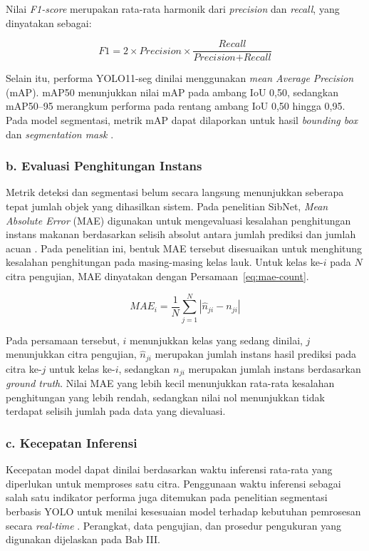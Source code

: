 Nilai \textit{F1-score} merupakan rata-rata harmonik dari \textit{precision} dan \textit{recall}, yang dinyatakan sebagai:

\begin{equation}
    F1 = 2 \times
		{\textit{Precision}} \times
    \frac{\textit{Recall}}
         {\textit{Precision} + \textit{Recall}}
    \label{eq:f1}
\end{equation}

Selain itu, performa YOLO11-seg dinilai menggunakan \textit{mean Average Precision} (mAP). mAP50 menunjukkan nilai mAP pada ambang IoU 0,50, sedangkan mAP50--95 merangkum performa pada rentang ambang IoU 0,50 hingga 0,95. Pada model segmentasi, metrik mAP dapat dilaporkan untuk hasil \textit{bounding box} dan \textit{segmentation mask} \cite{qiu2025,syafira2025}.

\subsubsection*{b. Evaluasi Penghitungan Instans}

Metrik deteksi dan segmentasi belum secara langsung menunjukkan seberapa tepat jumlah objek yang dihasilkan sistem. Pada penelitian SibNet, \textit{Mean Absolute Error} (MAE) digunakan untuk mengevaluasi kesalahan penghitungan instans makanan berdasarkan selisih absolut antara jumlah prediksi dan jumlah acuan \cite{nguyen2022sibnet}. Pada penelitian ini, bentuk MAE tersebut disesuaikan untuk menghitung kesalahan penghitungan pada masing-masing kelas lauk. Untuk kelas ke-$i$ pada $N$ citra pengujian, MAE dinyatakan dengan Persamaan~\ref{eq:mae-count}.

\begin{equation}
    MAE_i = \frac{1}{N} \sum_{j=1}^{N} \left|\hat{n}_{ji} - n_{ji}\right|
    \label{eq:mae-count}
\end{equation}

Pada persamaan tersebut, $i$ menunjukkan kelas yang sedang dinilai, $j$ menunjukkan citra pengujian, $\hat{n}_{ji}$ merupakan jumlah instans hasil prediksi pada citra ke-$j$ untuk kelas ke-$i$, sedangkan $n_{ji}$ merupakan jumlah instans berdasarkan \textit{ground truth}. Nilai MAE yang lebih kecil menunjukkan rata-rata kesalahan penghitungan yang lebih rendah, sedangkan nilai nol menunjukkan tidak terdapat selisih jumlah pada data yang dievaluasi.

\subsubsection*{c. Kecepatan Inferensi}

Kecepatan model dapat dinilai berdasarkan waktu inferensi rata-rata yang diperlukan untuk memproses satu citra. Penggunaan waktu inferensi sebagai salah satu indikator performa juga ditemukan pada penelitian segmentasi berbasis YOLO untuk menilai kesesuaian model terhadap kebutuhan pemrosesan secara \textit{real-time} \cite{syafira2025}. Perangkat, data pengujian, dan prosedur pengukuran yang digunakan dijelaskan pada Bab III.
